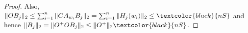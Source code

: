 \documentclass[journal,twoside,web]{ieeecolor}
\begin{document}
\begin{proof}
    \textcolor{black}{Also},
   \(
   \|OB_j\|_2 \le 
     \sum_{i=1}^{n} \|CA_{w_i}B_j\|_2=
      \sum_{i=1}^{n} \|H_j(w_i)\|_2 \le \textcolor{black}{nS}
   \)
   and hence
   \( \|B_j\|_2=\|O^{+}O B_j\|_2 \le \|O^{+}\|_2 \textcolor{black}{nS}  \).  %
   

\end{proof}
\end{document}
